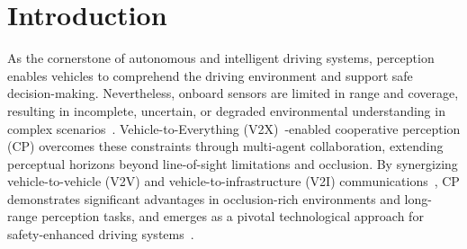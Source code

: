 
\section{Introduction}



\IEEEPARstart
As the cornerstone of autonomous and intelligent driving systems, perception enables vehicles to comprehend the driving environment and support safe decision-making. Nevertheless, onboard sensors are limited in range and coverage, resulting in incomplete, uncertain, or degraded environmental understanding in complex scenarios~\cite{zhang2023perception}. Vehicle-to-Everything (V2X)~\cite{chen2023cellular}-enabled cooperative perception (CP) overcomes these constraints through multi-agent collaboration, extending perceptual horizons beyond line-of-sight limitations and occlusion. By synergizing vehicle-to-vehicle (V2V) and vehicle-to-infrastructure (V2I) communications~\cite{tian2024msra}, CP demonstrates significant advantages in occlusion-rich environments and long-range perception tasks, and emerges as a pivotal technological approach for safety-enhanced driving systems~\cite{yang2024v2x,jiang2024weather,xiang2022v2xp}.





